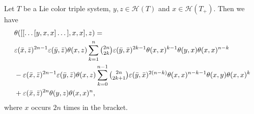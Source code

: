 \documentclass[11pt, twoside]{article}
\begin{document}
\begin{prop}\label{p5.16}
    Let $T$ be a Lie color triple system, $y,z\in \mathcal{H}(T) $ and $x\in \mathcal{H}(T_+)$. Then we have \begin{align*}
       & \theta([[\dots[y,x,x]\dots],x,x],z)=\\ & \varepsilon(\bar{x},\bar{z})^{2n-1}\varepsilon(\bar{y},\bar{z})\theta(x,z)\sum\limits_{k=1}^n \tbinom{2n}{2k}\varepsilon(\bar{y},\bar{x})^{2k-1}\theta(x,x)^{k-1}\theta(y,x)\theta(x,x)^{n-k} \\ &- \varepsilon(\bar{x},\bar{z})^{2n-1}\varepsilon(\bar{y},\bar{z})\theta(x,z)\sum\limits_{k=0}^{n-1}\tbinom{2n}{2k+1}\varepsilon(\bar{y},\bar{x})^{2(n-k)}\theta(x,x)^{n-k-1}\theta(x,y)\theta(x,x)^k \\ &+ \varepsilon(\bar{x},\bar{z})^{2n}\theta(y,z)\theta(x,x)^n ,
    \end{align*} where $x$ occurs $2n$ times in the bracket.
\end{prop}
\end{document}
